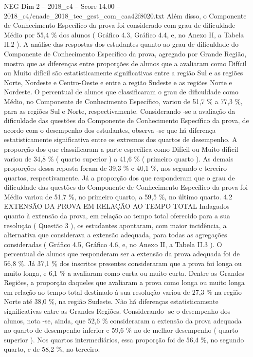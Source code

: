 \begin{textsample}{NEG Dim 2 – 2018\_c4 – Score 14.00 – 2018\_c4/enade\_2018\_tec\_gest\_com\_caa42f8020.txt}
Além disso, o Componente de Conhecimento Específico da prova foi considerado com grau de dificuldade Médio por 55,4 \% dos alunos ( Gráfico 4.3, Gráfico 4.4, e, no Anexo II, a Tabela II.2 ).
A análise das respostas dos estudantes quanto ao grau de dificuldade do Componente de Conhecimento Específico da prova, agregado por Grande Região, mostra que as diferenças entre proporções de alunos que a avaliaram como Difícil ou Muito difícil são estatisticamente significativas entre a região Sul e as regiões Norte, Nordeste e Centro-Oeste e entre a região Sudeste e as regiões Norte e Nordeste.
O percentual de alunos que classificaram o grau de dificuldade como Médio, no Componente de Conhecimento Específico, variou de 51,7 \% a 77,3 \%, para as regiões Sul e Norte, respectivamente.
Considerando -se a avaliação da dificuldade das questões do Componente de Conhecimento Específico da prova, de acordo com o desempenho dos estudantes, observa -se que há diferença estatisticamente significativa entre os extremos dos quartos de desempenho.
A proporção dos que classificaram a parte específica como Difícil ou Muito difícil variou de 34,8 \% ( quarto superior ) a 41,6 \% ( primeiro quarto ).
As demais proporções dessa reposta foram de 39,3 \% e 40,1 \%, nos segundo e terceiro quartos, respectivamente.
Já a proporção dos que responderam que o grau de dificuldade das questões do Componente de Conhecimento Específico da prova foi Médio variou de 51,7 \%, no primeiro quarto, a 59,5 \%, no último quarto. 4.2 EXTENSÃO DA PROVA EM RELAÇÃO AO TEMPO TOTAL Indagados quanto à extensão da prova, em relação ao tempo total oferecido para a sua resolução ( Questão 3 ), os estudantes apontaram, com maior incidência, a alternativa que considerava a extensão adequada, para todas as agregações consideradas ( Gráfico 4.5, Gráfico 4.6, e, no Anexo II, a Tabela II.3 ).
O percentual de alunos que responderam ser a extensão da prova adequada foi de 56,8 \%.
Já 37,1 \% dos inscritos presentes consideraram que a prova foi longa ou muito longa, e 6,1 \% a avaliaram como curta ou muito curta.
Dentre as Grandes Regiões, a proporção daqueles que avaliaram a prova como longa ou muito longa em relação ao tempo total destinado à sua resolução variou de 27,3 \% na região Norte até 38,0 \%, na região Sudeste.
Não há diferenças estatisticamente significativas entre as Grandes Regiões.
Considerando -se o desempenho dos alunos, nota -se, ainda, que 52,6 \% consideraram a extensão da prova adequada no quarto de desempenho inferior e 59,6 \% no de melhor desempenho ( quarto superior ).
Nos quartos intermediários, essa proporção foi de 56,4 \%, no segundo quarto, e de 58,2 \%, no terceiro.

\end{textsample}
